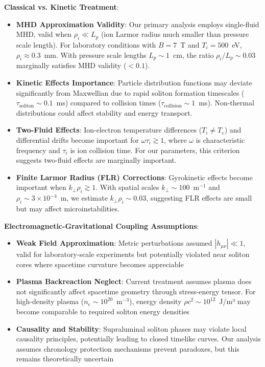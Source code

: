 \documentclass[12pt,a4paper]{article}
\begin{document}
\textbf{Classical vs. Kinetic Treatment}:
\begin{itemize}
\item \textbf{MHD Approximation Validity}: Our primary analysis employs single-fluid MHD, valid when $\rho_i \ll L_p$ (ion Larmor radius much smaller than pressure scale length). For laboratory conditions with $B = 7$~T and $T_i = 500$~eV, $\rho_i \approx 0.3$~mm. With pressure scale lengths $L_p \sim 1$~cm, the ratio $\rho_i/L_p \sim 0.03$ marginally satisfies MHD validity ($< 0.1$).
\item \textbf{Kinetic Effects Importance}: Particle distribution functions may deviate significantly from Maxwellian due to rapid soliton formation timescales ($\tau_{\text{soliton}} \sim 0.1$~ms) compared to collision times ($\tau_{\text{collision}} \sim 1$~ms). Non-thermal distributions could affect stability and energy transport.
\item \textbf{Two-Fluid Effects}: Ion-electron temperature differences ($T_i \neq T_e$) and differential drifts become important for $\omega \tau_i \gtrsim 1$, where $\omega$ is characteristic frequency and $\tau_i$ is ion collision time. For our parameters, this criterion suggests two-fluid effects are marginally important.
\item \textbf{Finite Larmor Radius (FLR) Corrections}: Gyrokinetic effects become important when $k_\perp \rho_i \gtrsim 1$. With spatial scales $k_\perp \sim 100$~m$^{-1}$ and $\rho_i \sim 3 \times 10^{-4}$~m, we estimate $k_\perp \rho_i \sim 0.03$, suggesting FLR effects are small but may affect microinstabilities.
\end{itemize}

\textbf{Electromagnetic-Gravitational Coupling Assumptions}:
\begin{itemize}
\item \textbf{Weak Field Approximation}: Metric perturbations assumed $|h_{\mu\nu}| \ll 1$, valid for laboratory-scale experiments but potentially violated near soliton cores where spacetime curvature becomes appreciable
\item \textbf{Plasma Backreaction Neglect}: Current treatment assumes plasma does not significantly affect spacetime geometry through stress-energy tensor. For high-density plasma ($n_e \sim 10^{20}$~m$^{-3}$), energy density $\rho c^2 \sim 10^{12}$~J/m³ may become comparable to required soliton energy densities
\item \textbf{Causality and Stability}: Supraluminal soliton phases may violate local causality principles, potentially leading to closed timelike curves. Our analysis assumes chronology protection mechanisms prevent paradoxes, but this remains theoretically uncertain
\end{itemize}
\end{document}
